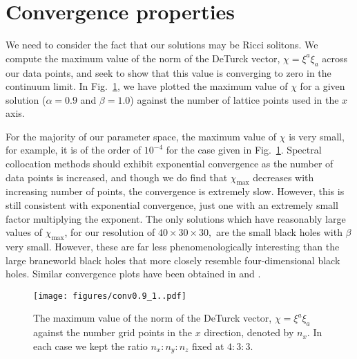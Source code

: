 \documentclass[%
 reprint,
 amsmath,amssymb,
 aps,
]{revtex4-2}
\begin{document}
\section{Convergence properties}
We need to consider the fact that our solutions may be Ricci solitons. We compute the maximum value of the norm of the DeTurck vector, $\chi = \xi^a \xi_a$ across our data points, and seek to show that this value is converging to zero in the continuum limit. In Fig.~\ref{fig:conv}, we have plotted the maximum value of $\chi$ for a given solution ($\alpha=0.9$ and $\beta=1.0$) against the number of lattice points used in the $x$ axis. 

For the majority of our parameter space, the maximum value of $\chi$ is very small, for example, it is of the order of $10^{-4}$ for the case given in Fig.~\ref{fig:conv}. Spectral collocation methods should exhibit exponential convergence as the number of data points is increased, and though we do find that $\chi_{\text{max}}$ decreases with increasing number of points, the convergence is extremely slow. However, this is still consistent with exponential convergence, just one with an extremely small factor multiplying the exponent. The only solutions which have reasonably large values of $\chi_{\text{max}}$, for our resolution of $40\times30\times30,$ are the small black holes with $\beta$ very small. However, these are far less phenomenologically interesting than the large braneworld black holes that more closely resemble four-dimensional black holes. Similar convergence plots have been obtained in \cite{Figueras:2011gd} and \cite{Stein:2016bnr}.

\begin{figure}[h!]
\texttt{[image: figures/conv0.9\_1..pdf]}
\caption{\label{fig:conv} The maximum value of the norm of the DeTurck vector, $\chi = \xi^a\xi_a$ against the number grid points in the $x$ direction, denoted by $n_x$. In each case we kept the ratio $n_x:n_y:n_z$ fixed at $4:3:3$.}
\end{figure}
\end{document}
